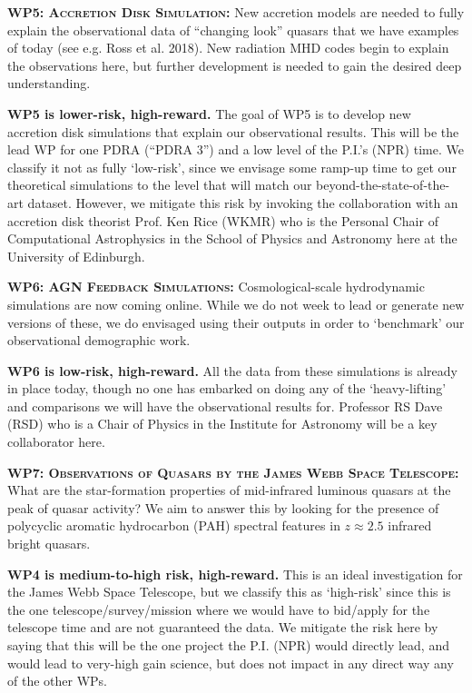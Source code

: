 \documentclass[oneside, a4paper, onecolumn, 11pt]{article}
\begin{document}
\smallskip
\smallskip
\noindent
\textbf{\textsc{WP5: Accretion Disk Simulation:}} 
New accretion models are needed to fully explain the observational
data of ``changing look'' quasars that we have examples of today (see
e.g. Ross et al. 2018). New radiation MHD codes begin to explain the
observations here, but further development is needed to gain the
desired deep understanding. 

\noindent
{\bf WP5 is lower-risk, high-reward.}
The goal of WP5 is to develop new accretion disk simulations that
explain our observational results.  This will be the lead WP for one
PDRA (``PDRA 3'') and a low level of the P.I.'s (NPR) time. We
classify it not as fully `low-risk', since we envisage some ramp-up
time to get our theoretical simulations to the level that will match
our beyond-the-state-of-the-art dataset. However, we mitigate this risk
by invoking the collaboration with an accretion disk theorist
Prof. Ken Rice (WKMR) who is the Personal Chair of Computational
Astrophysics in the School of Physics and Astronomy here at the
University of Edinburgh.


\smallskip
\smallskip
\noindent
\textbf{\textsc{WP6: AGN Feedback Simulations:}} 
Cosmological-scale hydrodynamic simulations are now coming online. 
While we do not week to lead or generate new versions of these, we do 
envisaged using their outputs in order to `benchmark' our observational 
demographic work. 

\noindent
{\bf WP6 is low-risk, high-reward.}
All the data from these simulations is already in place today, though no one 
has embarked on doing any of the `heavy-lifting' and comparisons we will 
have the observational results for. Professor RS Dave (RSD) who is a Chair of Physics 
in the Institute for Astronomy will be a key collaborator here. 


\smallskip
\smallskip
\noindent
\textbf{\textsc{WP7: Observations of Quasars by the James Webb Space Telescope:}} 
What are the star-formation properties of mid-infrared luminous quasars at the peak of quasar activity? 
We aim to answer this by looking for the presence of polycyclic aromatic hydrocarbon (PAH) spectral features 
in $z \approx 2.5$ infrared bright quasars. 

\noindent
{\bf WP4 is medium-to-high risk, high-reward.}
This is an ideal investigation for the James Webb Space Telescope, but we classify this as `high-risk' since this is the one telescope/survey/mission where we would have to bid/apply for the telescope time and are not guaranteed the data. We mitigate the risk here by saying that this will be the one project the P.I. (NPR) would directly lead, and would lead to very-high gain science, but does not impact in any direct way any of the other WPs. 
\end{document}
